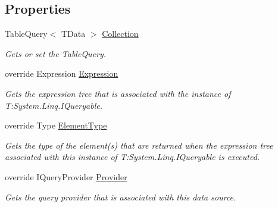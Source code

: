 \subsection*{Properties}
\begin{DoxyCompactItemize}
\item 
Table\+Query$<$ T\+Data $>$ \hyperlink{classCqrs_1_1Azure_1_1BlobStorage_1_1TableStorageStore_a97752ec9c5ad130a230924da9a75a537_a97752ec9c5ad130a230924da9a75a537}{Collection}
\begin{DoxyCompactList}\small\item\em Gets or set the Table\+Query. \end{DoxyCompactList}\item 
override Expression \hyperlink{classCqrs_1_1Azure_1_1BlobStorage_1_1TableStorageStore_af7d55541709a0519bdb0b5d201c5a97c_af7d55541709a0519bdb0b5d201c5a97c}{Expression}
\begin{DoxyCompactList}\small\item\em Gets the expression tree that is associated with the instance of T\+:\+System.\+Linq.\+I\+Queryable. \end{DoxyCompactList}\item 
override Type \hyperlink{classCqrs_1_1Azure_1_1BlobStorage_1_1TableStorageStore_a57e68c383098e81303eeebe0b85c970c_a57e68c383098e81303eeebe0b85c970c}{Element\+Type}
\begin{DoxyCompactList}\small\item\em Gets the type of the element(s) that are returned when the expression tree associated with this instance of T\+:\+System.\+Linq.\+I\+Queryable is executed. \end{DoxyCompactList}\item 
override I\+Query\+Provider \hyperlink{classCqrs_1_1Azure_1_1BlobStorage_1_1TableStorageStore_a95c1b0fce651992dd6bd75f44da15829_a95c1b0fce651992dd6bd75f44da15829}{Provider}
\begin{DoxyCompactList}\small\item\em Gets the query provider that is associated with this data source. \end{DoxyCompactList}\end{DoxyCompactItemize}


